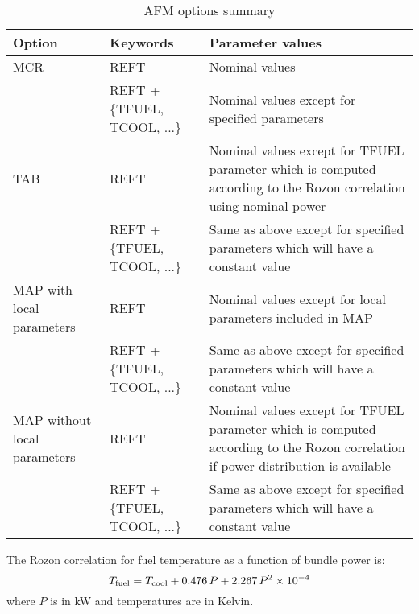 \begin{table}[!h]
\caption{AFM options summary}
\begin{center}
\begin{tabular}{|p{}|p{}|p{}|}
\hline
Option & Keywords & Parameter values \\
\hline
MCR  & REFT & Nominal values \\
  & REFT + \{TFUEL, TCOOL, ...\} & Nominal values except for specified parameters \\
\hline
TAB & REFT & Nominal values except for TFUEL parameter which is computed according to the Rozon correlation using nominal power\\
  & REFT + \{TFUEL, TCOOL, ...\} & Same as above except for specified parameters which will have a constant value \\
\hline
MAP with local parameters & REFT & Nominal values except for local parameters included in MAP\\
  & REFT + \{TFUEL, TCOOL, ...\} & Same as above except for specified parameters which will have a constant value\\
\hline
MAP without local parameters & REFT & Nominal values except for TFUEL parameter which is computed according to the Rozon correlation if power distribution is available\\
  & REFT + \{TFUEL, TCOOL, ...\} & Same as above except for specified parameters which will have a constant value\\
\hline

\end{tabular}
\end{center}
\label{tabAFM}
\end{table}

The Rozon correlation for fuel temperature as a function of bundle power is:
$$
T_{\rm fuel}= T_{\rm cool} + 0.476 \, P + 2.267 \, P^2 \times 10^{-4}
$$
where $P$ is in kW and temperatures are in Kelvin.

\clearpage

